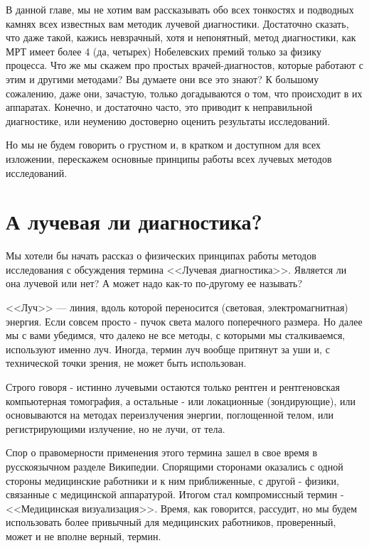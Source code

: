 В данной главе, мы не хотим вам рассказывать обо всех тонкостях и подводных камнях всех известных вам методик лучевой диагностики. Достаточно сказать, что даже такой, кажись невзрачный, хотя и непонятный, метод диагностики, как МРТ имеет более 4 (да, четырех) Нобелевских премий только за физику процесса. Что же мы скажем про простых врачей-диагностов, которые работают с этим и другими методами? Вы думаете они все это знают? К большому сожалению, даже они, зачастую, только догадываются о том,  что происходит в их аппаратах. Конечно, и достаточно часто, это приводит к неправильной диагностике, или неумению достоверно оценить результаты исследований.

Но мы не будем говорить о грустном и, в кратком и доступном для всех изложении, перескажем основные принципы работы всех лучевых методов исследований.

\section{А лучевая ли диагностика?}

Мы хотели бы начать рассказ о физических принципах работы методов исследования с обсуждения термина <<Лучевая диагностика>>. Является ли она лучевой или нет? А может надо как-то по-другому ее называть?

<<Луч>> --- линия, вдоль которой переносится (световая, электромагнитная) энергия. Если совсем просто - пучок света малого поперечного размера. Но далее мы с вами убедимся, что далеко не все методы, с которыми мы сталкиваемся, используют именно луч. Иногда, термин луч вообще притянут за уши и, с технической точки зрения, не может быть использован. 

Строго говоря - истинно лучевыми остаются только рентген и рентгеновская компьютерная томография, а остальные - или локационные (зондирующие), или основываются на методах переизлучения энергии, поглощенной телом, или регистрирующими излучение, но не лучи, от тела.

Спор о правомерности применения этого термина зашел в свое время в русскоязычном разделе Википедии. Спорящими сторонами оказались с одной стороны медицинские работники и к ним приближенные, с другой - физики, связанные с медицинской аппаратурой. Итогом стал компромиссный термин - <<Медицинская визуализация>>.
Время, как говорится, рассудит, но мы будем использовать более привычный для медицинских работников, проверенный, может и не вполне верный, термин.
